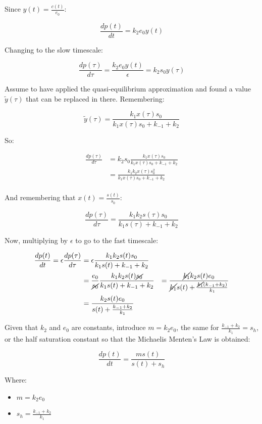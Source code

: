   Since $y(t) = \frac{c(t)}{e_0}$:

  $$\frac{dp(t)}{dt} = k_2e_0y(t)$$

  Changing to the slow timescale:

  $$\frac{dp(\tau)}{d\tau} = \frac{k_2e_0y(t)}{\epsilon} = k_2s_0y(\tau)$$

  Assume to have applied the quasi-equilibrium approximation and found a value $\tilde{y}(\tau)$ that can be replaced in there.
  Remembering:

  $$\tilde{y}(\tau) = \frac{k_1x(\tau)s_0}{k_1x(\tau)s_0 + k_{-1} + k_2}$$

  So:

  \begin{align*}
    \frac{dp(\tau)}{d\tau} &= k_2s_0\frac{k_1x(\tau)s_0}{k_1x(\tau)s_0 + k_{-1} + k_2}\\
                         &= \frac{k_1k_2x(\tau)s_0^2}{k_1x(\tau)s_0 + k_{-1} + k_2}\\
  \end{align*}

  And remembering that $x(t) = \frac{s(t)}{s_0}$:

  $$\frac{dp(\tau)}{d\tau} = \frac{k_1k_2s(\tau)s_0}{k_1s(\tau)+k_{-1}+k_2}$$

  Now, multiplying by $\epsilon$ to go to the fast timescale:

  \begin{align*}
    \frac{dp(t)}{dt} = \epsilon\frac{dp(\tau)}{d\tau} &= \epsilon\frac{k_1k_2s(t)s_0}{k_1s(t)+k_{-1}+k_2}\\
                                                      &= \frac{e_0}{\cancel{s_0}}\frac{k_1k_2s(t)\cancel{s_0}}{k_1s(t)+k_{-1}+k_2}
                                                      &= \frac{\cancel{k_1}k_2s(t)e_0}{\cancel{k_1}s(t)+\frac{\cancel{k_1}(k_{-1}+k_2)}{k_1}}\\
                                                      &= \frac{k_2s(t)e_0}{s(t)+\frac{k_{-1}+k_2}{k_1}}\\
  \end{align*}

  Given that $k_2$ and $e_0$ are constants, introduce $m = k_2e_0$, the same for $\frac{k_{-1}+k_2}{k_1}=s_h$, or the half saturation constant so that the Michaelis Menten's Law is obtained:

  $$\frac{dp(t)}{dt} = \frac{ms(t)}{s(t) + s_h}$$

  Where:

  \begin{multicols}{2}
    \begin{itemize}
      \item $m = k_2e_0$
      \item $s_h = \frac{k_{-1}+k_2}{k_1}$
    \end{itemize}
  \end{multicols}

